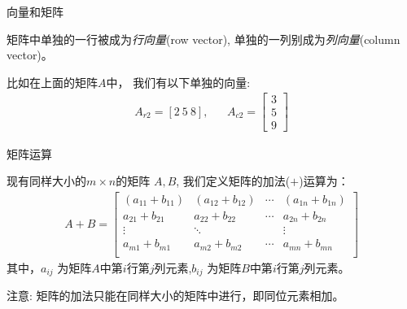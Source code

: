 \documentclass[handout]{beamer}
\begin{document}
\begin{frame}{向量和矩阵}
\begin{definition}
	矩阵中单独的一行被成为\textit{行向量}(row vector), 单独的一列别成为\textit{列向量}(column vector)。
\end{definition}
\begin{example}
比如在上面的矩阵$A$中，	我们有以下单独的向量:
\begin{align*}
	A_{r2} = [2 \ 5 \ 8],  & & A_{c2} = \begin{bmatrix}
		3 \\
		5 \\
		9 
	\end{bmatrix}
\end{align*}
\end{example}
\end{frame}

\begin{frame}{矩阵运算}
\begin{definition}
	现有同样大小的$m \times n$的矩阵 $A, B$, 我们定义矩阵的加法($+$)运算为：
	\begin{align*}
		A + B = \begin{bmatrix}
			(a_{11} + b_{11}) & (a_{12}+b_{12}) & \cdots & (a_{1n}+b_{1n}) \\
			a_{21} + b_{21} & a_{22}+b_{22} & \cdots & a_{2n}+b_{2n} \\
			\vdots & \ddots & & \vdots \\
			a_{m1} + b_{m1} & a_{m2}+b_{m2} & \cdots & a_{mn}+b_{mn} \\
		\end{bmatrix}
	\end{align*}
	其中，$a_{ij}$ 为矩阵$A$中第$i$行第$j$列元素,$b_{ij}$ 为矩阵$B$中第$i$行第$j$列元素。
\end{definition}

注意: 矩阵的加法只能在同样大小的矩阵中进行，即同位元素相加。	

\end{frame}
\end{document}
